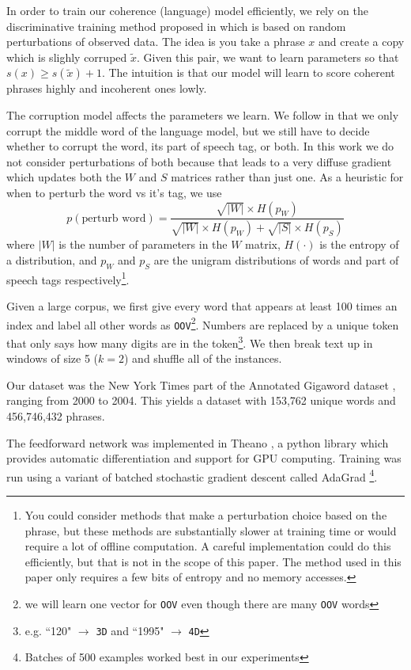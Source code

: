 \documentclass[11pt,letterpaper]{article}
\begin{document}
In order to train our coherence (language) model efficiently, we rely on
the discriminative training method proposed in \cite{rami} which is based
on random perturbations of observed data. The idea is you take a phrase $x$
and create a copy which is slighly corruped $\tilde{x}$. Given this pair,
we want to learn parameters so that $s(x) \ge s(\tilde{x}) + 1$.
The intuition is that our model will learn to score coherent phrases highly
and incoherent ones lowly.

The corruption model affects the parameters we learn.
We follow \cite{rami} in that we only corrupt the middle word of the language model,
but we still have to decide whether to corrupt the word, its part of speech tag, or both.
In this work we do not consider perturbations of both because that leads to a very
diffuse gradient which updates both the $W$ and $S$ matrices rather than just one.
As a heuristic for when to perturb the word vs it's tag, we use
\[
	p(\mbox{perturb word}) = \frac
		{\sqrt{|W|} \times H(p_W)}
	{\sqrt{|W|} \times H(p_W) + \sqrt{|S|} \times H(p_S)}
\]
where $|W|$ is the number of parameters in the $W$ matrix, $H(\cdot)$ is
the entropy of a distribution, and $p_W$ and $p_S$ are the unigram distributions
of words and part of speech tags respectively\footnote{You could consider methods
that make a perturbation choice based on the phrase, but these methods are
substantially slower at training time or would require a lot of offline computation.
A careful implementation could do this efficiently, but that is not in the scope of this paper.
The method used in this paper only requires a few bits of entropy and no memory accesses.}.



Given a large corpus, we first give every word that appears at least 100
times an index and label all other words as \texttt{OOV}\footnote{we will learn
one vector for \texttt{OOV} even though there are many \texttt{OOV} words}.
Numbers are replaced by a unique token that only says how many digits are in
the token\footnote{e.g. ``120" $\rightarrow$ \texttt{3D} and ``1995" $\rightarrow$ \texttt{4D}}.
We then break text up in windows of size 5 ($k=2$) and shuffle all of the instances.

Our dataset was the New York Times part of the Annotated Gigaword dataset \cite{agiga},
ranging from 2000 to 2004. This yields a dataset with 153,762 unique words and 
456,746,432 phrases.

The feedforward network was implemented in Theano \cite{theano},
a python library which provides automatic differentiation and support for GPU computing.
Training was run using a variant of batched stochastic gradient descent called AdaGrad \cite{adagrad}
\footnote{Batches of 500 examples worked best in our experiments}.
\end{document}
